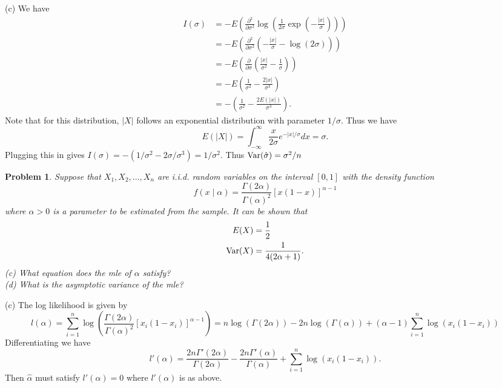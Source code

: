 \documentclass{article}
\newtheorem{problem}{Problem}
\newcommand{\var}{\textup{Var}}
\begin{document}
(c) We have
\begin{align*}
I(\sigma)
&= -E \left ( \frac{\partial^2}{\partial \sigma^2} \log \left ( \frac{1}{2\sigma} \exp \left (- \frac{|x|}{\sigma} \right ) \right ) \right )\\
&= -E \left ( \frac{\partial^2}{\partial \sigma^2} \left (-\frac{|x|}{\sigma} - \log(2 \sigma) \right ) \right )\\
&= -E \left ( \frac{\partial}{\partial \sigma} \left ( \frac{|x|}{\sigma^2} - \frac{1}{\sigma} \right ) \right )\\
&= -E \left ( \frac{1}{\sigma^2} - \frac{2|x|}{\sigma^3} \right )\\
&= -\left ( \frac{1}{\sigma^2} - \frac{2E(|x|)}{\sigma^3} \right ).
\end{align*}
Note that for this distribution, $|X|$ follows an exponential distribution with parameter $1/\sigma$. Thus we have
\[
E(|X|) = \int_{-\infty}^{\infty} \frac{x}{2\sigma} e^{-|x|/\sigma} dx = \sigma.
\]
Plugging this in gives $I(\sigma) = -(1/\sigma^2 - 2\sigma/\sigma^3) = 1/\sigma^2$. Thus $\var(\hat{\sigma}) = \sigma^2/n$

\begin{problem}
Suppose that $X_1, X_2, \dots , X_n$ are i.i.d. random variables on the interval $[0,1]$ with the density function
\[
f(x \mid \alpha) = \frac{\Gamma(2 \alpha)}{\Gamma(\alpha)^2}[x(1-x)]^{\alpha-1}
\]
where $\alpha > 0$ is a parameter to be estimated from the sample. It can be shown that
\begin{align*}
E(X) &= \frac{1}{2}\\
\var(X) &= \frac{1}{4(2 \alpha + 1)}.
\end{align*}
(c) What equation does the mle of $\alpha$ satisfy?\\
(d) What is the asymptotic variance of the mle?
\end{problem}

(c) The log likelihood is given by
\[
l(\alpha) = \sum_{i=1}^n \log \left ( \frac{\Gamma(2 \alpha)}{\Gamma(\alpha)^2}[x_i(1-x_i)]^{\alpha-1} \right ) = n\log(\Gamma(2 \alpha)) - 2n\log(\Gamma(\alpha)) + (\alpha - 1) \sum_{i=1}^n \log(x_i(1-x_i))
\]
Differentiating we have
\[
l'(\alpha) = \frac{2n \Gamma'(2\alpha)}{\Gamma(2 \alpha)} - \frac{2n \Gamma'(\alpha)}{\Gamma(\alpha)} + \sum_{i=1}^n \log(x_i(1-x_i)).
\]
Then $\hat{\alpha}$ must satisfy $l'(\alpha) = 0$ where $l'(\alpha)$ is as above.
\end{document}
